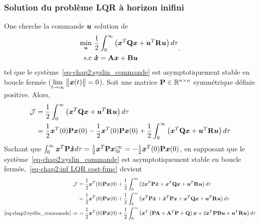 \subsubsection{Solution du problème LQR à horizon inifini}
One cherche la commande $\bm{u}$ solution de 
\begin{align}\label{eq-chap2:INFH-LQR optimal problem}
	\begin{split}
		\underset{\bm{u}}{\min}~&\frac{1}{2}\int_0^{\infty}\left(\bm{x}^T\mathbf{Q}\bm{x} + \bm{u}^T\mathbf{R}\bm{u}\right) d\tau \\
		{\rm s.c}~&\bm{\dot{x}} = \mathbf{A}\bm{x}+\mathbf{B}\bm{u}
	\end{split}.
\end{align}
tel que le système~\eqref{eq-chap2:syslin_commande} est asymptotiquement stable en boucle fermée ($\lim\limits_{t\rightarrow\infty}\begin{Vmatrix} \bm{x}(t) \end{Vmatrix}=0$).
Soit une matrice $\mathbf{P}\in \mathbb{R}^{n\times n}$ symmétrique définie positive. Alors, 
\begin{align}
	\begin{split}\label{eq-chap2:inf LQR cost-func}
		{\cal J} &= \frac{1}{2}\int_{0}^{\infty}\left(\bm{x}^T\mathbf{Q}\bm{x} + \bm{u}^T\mathbf{R}\bm{u}\right) d\tau\\
		&=\frac{1}{2}\bm{x}^T(0)\mathbf{P}\bm{x}(0) - \frac{1}{2}\bm{x}^T(0)\mathbf{P}\bm{x}(0)+ \frac{1}{2}\int_{0}^{\infty}\left(\bm{x}^T\mathbf{Q}\bm{x} + \bm{u}^T\mathbf{R}\bm{u}\right) d\tau
	\end{split}
\end{align}
Sachant que  $\int_{0}^{\infty}\bm{x}^T\mathbf{P}\bm{\dot{x}} d\tau = \frac{1}{2}\bm{x}^T\mathbf{P}\bm{x}|_{0}^{\infty} = -\frac{1}{2}\bm{x}^T(0)\mathbf{P}\bm{x}(0)$, en supposant que le système~\eqref{eq-chap2:syslin_commande} est asymptotiquement stable en boucle fermée,~\eqref{eq-chap2:inf LQR cost-func} devient 
\begin{align}\label{eq-chap2:inf LQR cost-func dev}
	\begin{split}
		{\cal J} &=\frac{1}{2}\bm{x}^T(0)\mathbf{P}\bm{x}(0) +  \frac{1}{2}\int_{0}^{\infty}\left(2\bm{x}^T\mathbf{P}\bm{\dot{x}} + \bm{x}^T\mathbf{Q}\bm{x} + \bm{u}^T\mathbf{R}\bm{u}\right) d\tau\\
		&=\frac{1}{2}\bm{x}^T(0)\mathbf{P}\bm{x}(0) +  \frac{1}{2}\int_{0}^{\infty}\left(\bm{x}^T\mathbf{P}\bm{\dot{x}} +\bm{\dot{x}}^T\mathbf{P}\bm{x}+ \bm{x}^T\mathbf{Q}\bm{x} + \bm{u}^T\mathbf{R}\bm{u}\right) d\tau\\
		\eqref{eq-chap2:syslin_commande}\Rightarrow&= \frac{1}{2}\bm{x}^T(0)\mathbf{P}\bm{x}(0) +  \frac{1}{2}\int_{0}^{\infty}\left(\bm{x}^T\left(\mathbf{P}\mathbf{A} + \mathbf{A}^T\mathbf{P}+\mathbf{Q}\right)\bm{x}
		 + 2\bm{x}^T\mathbf{P}\mathbf{B}\bm{u}+ \bm{u}^T\mathbf{R}\bm{u}\right) d\tau
	\end{split}
\end{align}

